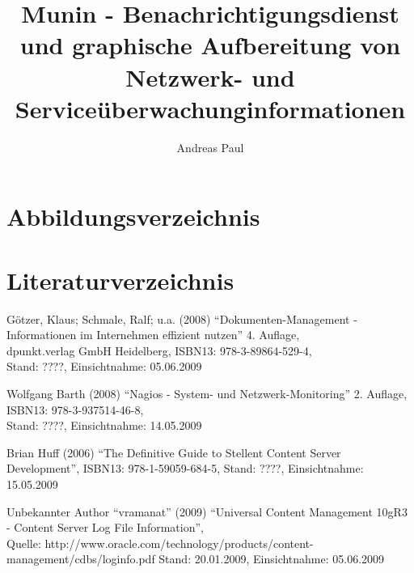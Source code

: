 \documentclass[12pt, a4paper, headsepline]{article}
\author{Andreas Paul}
\title{Munin - Benachrichtigungsdienst und graphische Aufbereitung von Netzwerk- und Serviceüberwachunginformationen}
\renewcommand{\refname}{Quellenverzeichnis}
\begin{document}
\setlength{\parindent}{0mm}

\thispagestyle{empty}
\newpage 
\renewcommand{\contentsname}{Inhalt}
\tableofcontents
\newpage

\newpage
 
\newpage
 \newpage
 \newpage
 \newpage
 \newpage
 \newpage
% 


\section{Abbildungsverzeichnis}
\listoffigures

\newpage
\renewcommand{\refname}{} 
\section{Literaturverzeichnis}
\begin{thebibliography}{xxxxxxxx}
	 Götzer, Klaus; Schmale, Ralf; u.a. (2008) "`Dokumenten-Management - Informationen im Internehmen effizient nutzen"' 4. Auflage,\\
	 dpunkt.verlag GmbH Heidelberg,  
	 ISBN13: 978-3-89864-529-4,\\
	 Stand: ????, Einsichtnahme: 05.06.2009

	 Wolfgang Barth (2008) "`Nagios - System- und Netzwerk-Monitoring"' 2. Auflage, \\
	 ISBN13: 978-3-937514-46-8, \\
	 Stand: ????, Einsichtnahme: 14.05.2009
	 
	 Brian Huff (2006) "`The Definitive Guide to Stellent Content Server Development"', \newline ISBN13: 978-1-59059-684-5, \newline Stand: ????, Einsichtnahme: 15.05.2009
	 
	 	  Unbekannter Author "`vramanat"' (2009) "`Universal Content Management 10gR3 - Content Server Log File Information"', \\ Quelle: http://www.oracle.com/technology/products/content-management/cdbs/loginfo.pdf \newline Stand: 20.01.2009, Einsichtnahme: 05.06.2009
\end{thebibliography}\newpage
\end{document}
